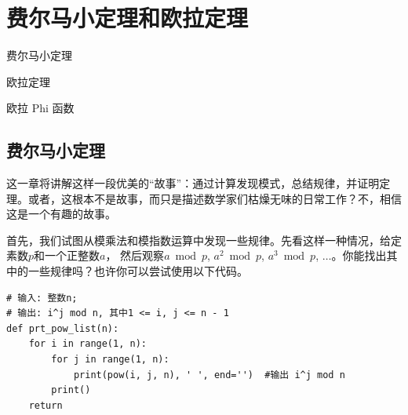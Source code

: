 
\chapter{费尔马小定理和欧拉定理}
\label{chap:flt-et} %

\begin{introduction}
  \item 费尔马小定理
  \item 欧拉定理
  \item 欧拉 Phi 函数
\end{introduction}

\section{费尔马小定理}
\label{sec:flt}

这一章将讲解这样一段优美的“故事”：通过计算发现模式，总结规律，并证明定理。或者，这根本不是故事，而只是描述数学家们枯燥无味的日常工作？不，相信这是一个有趣的故事。

首先，我们试图从模乘法和模指数运算中发现一些规律。先看这样一种情况，给定素数$p$和一个正整数$a$，
然后观察$a \bmod p$, $a^2 \bmod p$, $a^3 \bmod p$, $\ldots$。你能找出其中的一些规律吗？也许你可以尝试使用以下代码。

\begin{lstlisting}
# 输入: 整数n;
# 输出: i^j mod n, 其中1 <= i, j <= n - 1
def prt_pow_list(n):
    for i in range(1, n):
        for j in range(1, n):
            print(pow(i, j, n), ' ', end='')  #输出 i^j mod n
        print()
    return
\end{lstlisting}

